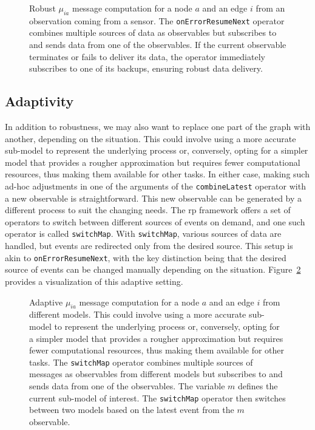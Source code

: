 \begin{figure}
  \centering
  \resizebox{\textwidth}{!}{}
  \caption{
    Robust $\mu_{ia}$ message computation for a node $a$ and an edge $i$ from an observation coming from a sensor.
    The \texttt{onErrorResumeNext} operator combines multiple sources of data as observables but
    subscribes to and sends data from one of the observables.
    If the current observable terminates or fails to deliver its data, the operator immediately
    subscribes to one of its backups, ensuring robust data delivery.
  }
  \label{fig:rmp:reactive_robustness}
\end{figure}

\subsection{Adaptivity}

In addition to robustness, we may also want to replace one part of the graph with another,
depending on the situation.
This could involve using a more accurate sub-model to represent the underlying process or,
conversely, opting for a simpler model that provides a rougher approximation but requires
fewer computational resources, thus making them available for other tasks.
In either case, making such ad-hoc adjustments in one of the arguments of the
\texttt{combineLatest} operator with a new observable is straightforward.
This new observable can be generated by a different process to suit the changing needs.
The \ac{rp} framework offers a set of operators to switch between different
sources of events on demand, and one such operator is called \texttt{switchMap}.
With \texttt{switchMap}, various sources of data are handled, but events are redirected only
from the desired source.
This setup is akin to \texttt{onErrorResumeNext}, with the key distinction being that the desired source of events can be changed manually depending on the situation.
Figure~\ref{fig:rmp:reactive_adaptability} provides a visualization of this adaptive setting.

\begin{figure}
  \centering
  \resizebox{\textwidth}{!}{}
  \caption{
    Adaptive $\mu_{ia}$ message computation for a node $a$ and an edge $i$ from different models.
    This could involve using a more accurate sub-model to represent the underlying process or,
    conversely, opting for a simpler model that provides a rougher approximation but requires
    fewer computational resources, thus making them available for other tasks.
    The \texttt{switchMap} operator combines multiple sources of messages as observables from
    different models but subscribes to and sends data from one of the observables.
    The variable $m$ defines the current sub-model of interest.
    The \texttt{switchMap} operator then switches between two models based on the latest event
    from the $m$ observable.
  }
  \label{fig:rmp:reactive_adaptability}
\end{figure}

